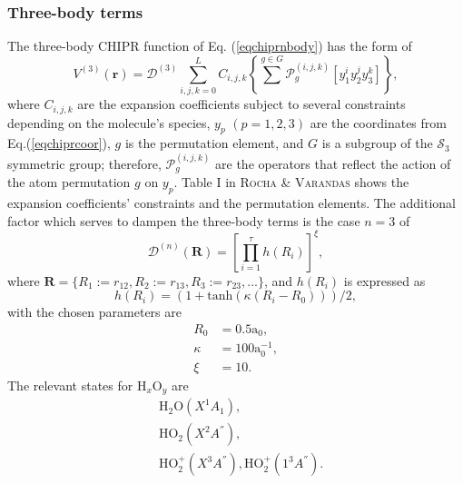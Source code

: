 \documentclass[12pt]{article}
\begin{document}
\subsubsection{Three-body terms}
The three-body CHIPR function of Eq. (\ref{eqchiprnbody}) has the form of
\begin{equation}
    V^{(3)}(\mathbf{r}) = \mathcal{D}^{(3)} \sum^L_{i,j,k=0}C_{i,j,k}\left\{\sum ^{g\in G} \mathcal{P}_g^{(i,j,k)}\left[y_1^iy_2^jy_3^k\right]\right\},
    \label{eqchipr3body}
\end{equation}
where $C_{i,j,k}$ are the expansion coefficients subject to several constraints depending on the molecule's species, $y_p$ $(p=1,2,3)$ are the coordinates from Eq.(\ref{eqchiprcoor}), $g$ is the permutation element, and $G$ is a subgroup of the $\mathcal{S}_3$ symmetric group; therefore, $\mathcal{P}_g^{(i,j,k)}$ are the operators that reflect the action of the atom permutation $g$ on $y_p$. Table I in \textsc{Rocha \& Varandas} \cite{idx150} shows the expansion coefficients' constraints and the permutation elements. The additional factor which serves to dampen the three-body terms is the case $n=3$ of
\begin{equation}
    \mathcal{D}^{(n)}(\mathbf{R}) = \left[\prod^{\tau}_{i=1}h(R_i)\right]^{\xi},
    \label{eqchipr3bodydamp}
\end{equation}
where $\mathbf{R} = \{R_1:=r_{12}, R_2:=r_{13}, R_3:=r_{23}, ...\}$, and $h(R_i)$ is expressed as
\begin{equation}
    h(R_i) = (1+\text{tanh}(\kappa(R_i-R_0)))/2,
\end{equation}
with the chosen parameters are
\begin{equation}
    \begin{split}
        R_0 &= 0.5\text{a}_0, \\
        \kappa &= 100\text{a}_0^{-1}, \\
        \xi &= 10.
    \end{split}
\end{equation}
The relevant states for H$_x$O$_y$ are
\begin{equation}
    \begin{split}
        &\text{H}_2\text{O}(X^1A_1), \\
        &\text{HO}_2(X^2A^{''}), \\ 
        &\text{HO}_2^+(X^3A^{''}), \text{HO}_2^+(1^3A^{''}).
    \end{split}
\end{equation}
\end{document}
